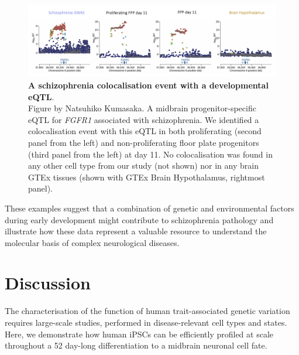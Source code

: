 \begin{figure}[h]
\centering
\includegraphics[width=15.5cm]{Chapter5/Fig/neuroseq_coloc_example2_FGFR1.png}
\caption[Second example of colocalisation]{\textbf{A schizophrenia colocalisation event with a developmental eQTL}.\\
Figure by Natsuhiko Kumasaka. A midbrain progenitor-specific eQTL for \textit{FGFR1} associated with schizophrenia. 
We identified a colocalisation event with this eQTL in both proliferating (second panel from the left) and non-proliferating floor plate progenitors (third panel from the left) at day 11. 
No colocalisation was found in any other cell type from our study (not shown) nor in any brain GTEx tissues (shown with GTEx Brain Hypothalamus, rightmost panel).}
\label{fig:neuroseq_coloc_example2}
\end{figure}

\newpage

These examples suggest that a combination of genetic and environmental factors during early development might contribute to schizophrenia pathology and illustrate how these data represent a valuable resource to understand the molecular basis of complex neurological diseases.



\section{Discussion}
\label{sec:neuroseq_discussion}





The characterisation of the function of human trait-associated genetic variation requires large-scale studies, performed in disease-relevant cell types and states. 
Here, we demonstrate how human iPSCs can be efficiently profiled at scale throughout a 52 day-long differentiation to a midbrain neuronal cell fate. \\

